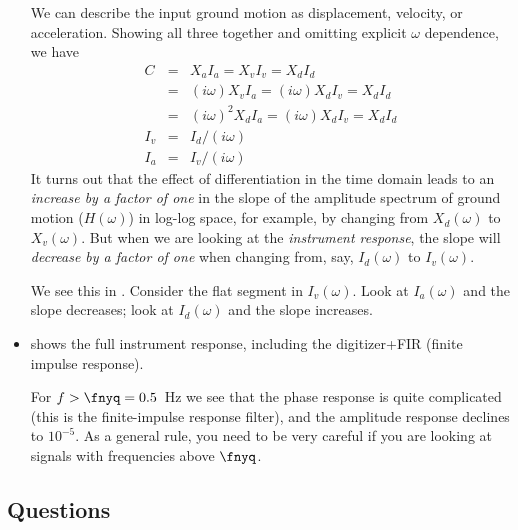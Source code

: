 \documentclass[11pt,titlepage,fleqn]{article}
\begin{document}
\begin{itemize}
We can describe the input ground motion as displacement, velocity, or acceleration. Showing all three together and omitting explicit $\omega$ dependence, we have
%
\begin{eqnarray}
C &=& X_a I_a = X_v I_v =  X_d I_d 
\\
&=& (i\omega) X_v I_a = (i\omega) X_d I_v =  X_d I_d 
\\
&=& (i\omega)^2 X_d I_a = (i\omega) X_d I_v =  X_d I_d 
\\
I_v &=& I_d / (i\omega)
\\
I_a &=& I_v / (i\omega)
\end{eqnarray}
%
It turns out that the effect of differentiation in the time domain leads to an {\em increase by a factor of one} in the slope of the amplitude spectrum of ground motion ($H(\omega)$) in log-log space, for example, by changing from $X_d(\omega)$ to $X_v(\omega)$. But when we are looking at the {\em instrument response}, the slope will {\em decrease by a factor of one} when changing from, say, $I_d(\omega)$ to $I_v(\omega)$.

We see this in . Consider the flat segment in $I_v(\omega)$. Look at $I_a(\omega)$ and the slope decreases; look at $I_d(\omega)$ and the slope increases.


\item {} shows the full instrument response, including the digitizer+FIR (finite impulse response).

For $f > \fnyq = 0.5$~Hz we see that the phase response is quite complicated (this is the finite-impulse response filter), and the amplitude response declines to $10^{-5}$. As a general rule, you need to be very careful if you are looking at signals with frequencies above $\fnyq$.


\end{itemize}


\subsection*{Questions}
\end{document}
